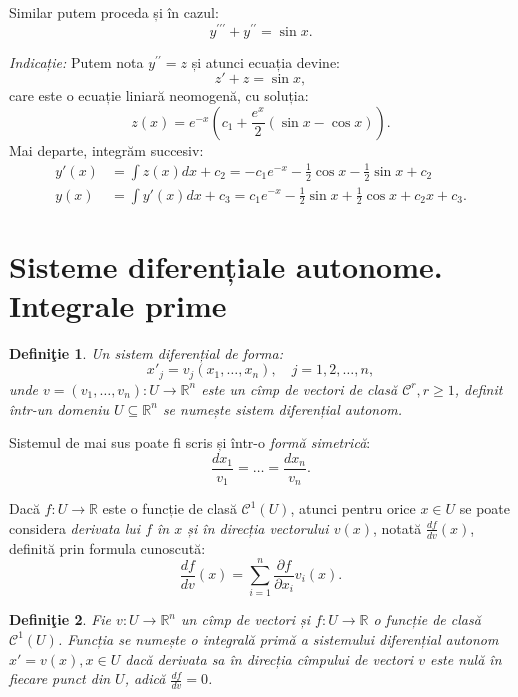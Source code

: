 \documentclass[11pt,a4paper]{article}
\newcommand\kal{\mathcal}
\newcommand\seq{\subseteq}
\newcommand\RR{\mathbb{R}}
\theoremstyle{dotless}
\theoremstyle{dotlessdr}
\newtheorem{definition}{Defini\c{t}ie}[section]
\begin{document}
\vspace{1cm}

Similar putem proceda și în cazul:
\[
  y^{\prime\prime\prime} + y^{\prime\prime} = \sin x.
\]

\emph{Indicație:} Putem nota $y^{\prime\prime} = z$ și atunci ecuația devine:
\[
  z' + z = \sin x,
\]
care este o ecuație liniară neomogenă, cu soluția:
\[
  z(x) = e^{-x}(c_1 + \frac{e^x}{2}(\sin x - \cos x)).
\]
Mai departe, integrăm succesiv:
\begin{align*}
  y'(x) &= \int z(x) dx + c_2 = -c_1 e^{-x} - \frac{1}{2} \cos x - \frac{1}{2}\sin x + c_2 \\
  y(x) &= \int y'(x) dx + c_3 = c_1 e^{-x} - \frac{1}{2} \sin x + \frac{1}{2} \cos x + c_2 x + c_3.
\end{align*}



\section{Sisteme diferențiale autonome. Integrale prime}
\begin{definition}\label{def:s-d-autonom}
  Un sistem diferențial de forma:
  \[
    x'_j = v_j(x_1, \dots, x_n), \quad j = 1, 2, \dots, n,
  \]
  unde $v = (v_1, \dots, v_n) : U \to \RR^n$ este un cîmp de vectori de
  clasă $\kal{C}^r, r \geq 1$, definit într-un domeniu $U \seq \RR^n$
  se numește \emph{sistem diferențial autonom}.
\end{definition}

Sistemul de mai sus poate fi scris și într-o \emph{formă simetrică}:
\[
  \frac{dx_1}{v_1} = \dots = \frac{dx_n}{v_n}.
\]

Dacă $f : U \to \RR$ este o funcție de clasă $\kal{C}^1(U)$, atunci pentru orice
$x \in U$ se poate considera \emph{derivata lui $f$ în $x$ și în direcția vectorului %
  $v(x)$}, notată $\frac{df}{dv}(x)$, definită prin formula cunoscută:
\[
  \frac{df}{dv}(x) = \sum_{i = 1}^n \frac{\partial f}{\partial x_i} v_i(x).
\]

\begin{definition}\label{def:int-prim}
  Fie $v : U \to \RR^n$ un cîmp de vectori și $f : U \to \RR$ o funcție de clasă
  $\kal{C}^1(U)$. Funcția se numește o \emph{integrală primă} a sistemului diferențial
  autonom $x' = v(x), x \in U$ dacă derivata sa în direcția cîmpului de vectori $v$
  este nulă în fiecare punct din $U$, adică $\frac{df}{dv} = 0$.
\end{definition}
\end{document}
